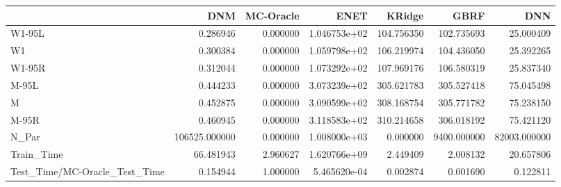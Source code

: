 \begin{tabular}{lrrrrrr}
\toprule
{} &            DNM &  MC-Oracle &          ENET &      KRidge &         GBRF &           DNN \\
\midrule
W1-95L                        &       0.286946 &   0.000000 &  1.046753e+02 &  104.756350 &   102.735693 &     25.000409 \\
W1                            &       0.300384 &   0.000000 &  1.059798e+02 &  106.219974 &   104.436050 &     25.392265 \\
W1-95R                        &       0.312044 &   0.000000 &  1.073292e+02 &  107.969176 &   106.580319 &     25.837340 \\
M-95L                         &       0.444233 &   0.000000 &  3.073239e+02 &  305.621783 &   305.527418 &     75.045498 \\
M                             &       0.452875 &   0.000000 &  3.090599e+02 &  308.168754 &   305.771782 &     75.238150 \\
M-95R                         &       0.460945 &   0.000000 &  3.118583e+02 &  310.214658 &   306.018192 &     75.421120 \\
N\_Par                         &  106525.000000 &   0.000000 &  1.008000e+03 &    0.000000 &  9400.000000 &  82003.000000 \\
Train\_Time                    &      66.481943 &   2.960627 &  1.620766e+09 &    2.449409 &     2.008132 &     20.657806 \\
Test\_Time/MC-Oracle\_Test\_Time &       0.154944 &   1.000000 &  5.465620e-04 &    0.002874 &     0.001690 &      0.122811 \\
\bottomrule
\end{tabular}
